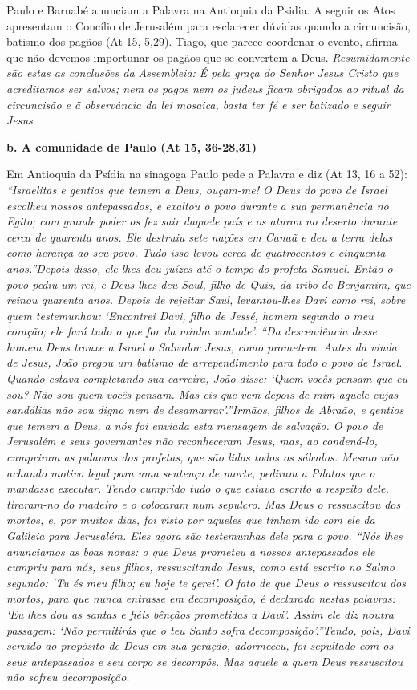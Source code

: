 \documentclass[
]{book}
\begin{document}
Paulo e Barnabé anunciam a Palavra na Antioquia da Psidia. A seguir os Atos apresentam o Concílio de Jerusalém para esclarecer dúvidas quando a circuncisão, batismo dos pagãos (At 15, 5,29). Tiago, que parece coordenar o evento, afirma que não devemos importunar os pagãos que se convertem a Deus. \emph{Resumidamente são estas as conclusões da Assembleia: É pela graça do Senhor Jesus Cristo que acreditamos ser salvos; nem os pagos nem os judeus ficam obrigados ao ritual da circuncisão e ä observância da lei mosaica, basta ter fé e ser batizado e seguir Jesus}.

\textbf{b. A comunidade de Paulo (At 15, 36-28,31)}

Em Antioquia da Psídia na sinagoga Paulo pede a Palavra e diz (At 13, 16 a 52): \emph{``Israelitas e gentios que temem a Deus, ouçam-me! O Deus do povo de Israel escolheu nossos antepassados, e exaltou o povo durante a sua permanência no Egito; com grande poder os fez sair daquele país e os aturou no deserto durante cerca de quarenta anos. Ele destruiu sete nações em Canaã e deu a terra delas como herança ao seu povo. Tudo isso levou cerca de quatrocentos e cinquenta anos.''Depois disso, ele lhes deu juízes até o tempo do profeta Samuel. Então o povo pediu um rei, e Deus lhes deu Saul, filho de Quis, da tribo de Benjamim, que reinou quarenta anos. Depois de rejeitar Saul, levantou-lhes Davi como rei, sobre quem testemunhou: `Encontrei Davi, filho de Jessé, homem segundo o meu coração; ele fará tudo o que for da minha vontade'. ``Da descendência desse homem Deus trouxe a Israel o Salvador Jesus, como prometera. Antes da vinda de Jesus, João pregou um batismo de arrependimento para todo o povo de Israel. Quando estava completando sua carreira, João disse: `Quem vocês pensam que eu sou? Não sou quem vocês pensam. Mas eis que vem depois de mim aquele cujas sandálias não sou digno nem de desamarrar'.''Irmãos, filhos de Abraão, e gentios que temem a Deus, a nós foi enviada esta mensagem de salvação. O povo de Jerusalém e seus governantes não reconheceram Jesus, mas, ao condená-lo, cumpriram as palavras dos profetas, que são lidas todos os sábados. Mesmo não achando motivo legal para uma sentença de morte, pediram a Pilatos que o mandasse executar. Tendo cumprido tudo o que estava escrito a respeito dele, tiraram-no do madeiro e o colocaram num sepulcro. Mas Deus o ressuscitou dos mortos, e, por muitos dias, foi visto por aqueles que tinham ido com ele da Galileia para Jerusalém. Eles agora são testemunhas dele para o povo. ``Nós lhes anunciamos as boas novas: o que Deus prometeu a nossos antepassados ele cumpriu para nós, seus filhos, ressuscitando Jesus, como está escrito no Salmo segundo: `Tu és meu filho; eu hoje te gerei'. O fato de que Deus o ressuscitou dos mortos, para que nunca entrasse em decomposição, é declarado nestas palavras: `Eu lhes dou as santas e fiéis bênçãos prometidas a Davi'. Assim ele diz noutra passagem: `Não permitirás que o teu Santo sofra decomposição'.''Tendo, pois, Davi servido ao propósito de Deus em sua geração, adormeceu, foi sepultado com os seus antepassados e seu corpo se decompôs. Mas aquele a quem Deus ressuscitou não sofreu decomposição}.
\end{document}
